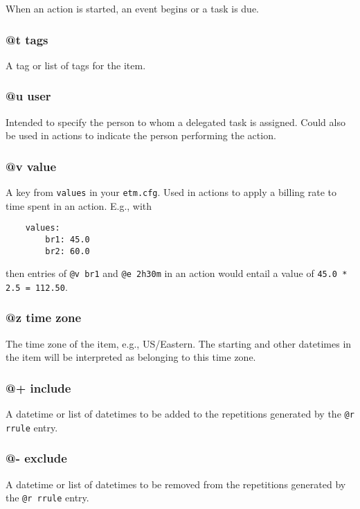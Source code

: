 \documentclass[]{article}
\begin{document}
When an action is started, an event begins or a task is due.

\subsubsection{@t tags}

A tag or list of tags for the item.

\subsubsection{@u user}

Intended to specify the person to whom a delegated task is assigned.
Could also be used in actions to indicate the person performing the
action.

\subsubsection{@v value}

A key from \texttt{values} in your \texttt{etm.cfg}. Used in actions to
apply a billing rate to time spent in an action. E.g., with

\begin{verbatim}
    values:
        br1: 45.0
        br2: 60.0
\end{verbatim}

then entries of \texttt{@v br1} and \texttt{@e 2h30m} in an action would
entail a value of \texttt{45.0 * 2.5 = 112.50}.

\subsubsection{@z time zone}

The time zone of the item, e.g., US/Eastern. The starting and other
datetimes in the item will be interpreted as belonging to this time
zone.

\subsubsection{@+ include}

A datetime or list of datetimes to be added to the repetitions generated
by the \texttt{@r rrule} entry.

\subsubsection{@- exclude}

A datetime or list of datetimes to be removed from the repetitions
generated by the \texttt{@r rrule} entry.
\end{document}
